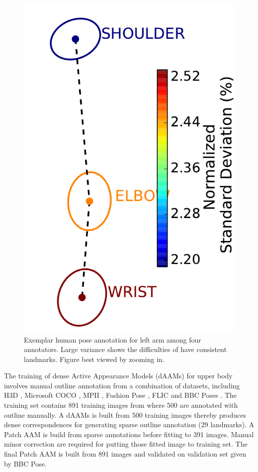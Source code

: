 \begin{figure}[t!]
    \includegraphics[height=\vfh]{resources/Fig_Variance/variances}
    \caption{Exemplar human pose annotation for left arm among four annotators. Large variance shows the difficulties of have consistent landmarks. Figure best viewed by zooming in.}
    \label{fig:variance}
\end{figure}

The training of dense Active Appearance Models (dAAMs) for upper body involves manual outline annotation from a combination of datasets, including H3D \cite{PoseletsICCV09}, Microsoft COCO \cite{lin2014microsoft}, MPII \cite{andriluka14cvpr}, Fashion Pose \cite{dantone2013human}, FLIC \cite{sapp2013modec} and BBC Poses \cite{pfister2015flowing}. The training set contains 891 training images from where 500 are annotated with outline manually. A dAAMs is built from 500 training images thereby produces dense correspondences for generating sparse outline annotation (29 landmarks). A Patch AAM is build from sparse annotations before fitting to 391 images. Manual minor correction are required for putting those fitted image to training set. The final Patch AAM is built from 891 images and validated on validation set given by BBC Pose.

